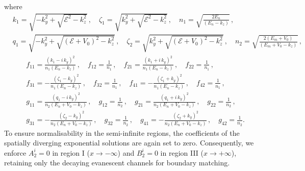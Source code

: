 \documentclass[aps,prb,onecolumn,longbibliography,nofootinbib,citeautoscript,10pt]{revtex4-2}
\def \nn{\nonumber \\}
\def\nn{\nonumber \\}
\def \nn{\nonumber \\}
\begin{document}
where 
\begin{align}
&k_1 =  \sqrt{ -k_y^2 + \sqrt{\mathcal{E}^2 - k_z^2} } \,,  \quad 
\zeta_1 =  \sqrt{ k_y^2 + \sqrt{\mathcal{E}^2 - k_z^2} } \,,  \quad 
n_1=\sqrt{\frac{2E_n} { (E_n-k_z)}} \,,  \nn  &
q_1 =  \sqrt{ -k_y^2 + \sqrt{(\mathcal{E}+V_0)^2 - k_z^2} } \,,  \quad 
\zeta_2 =  \sqrt{ k_y^2 + \sqrt{(\mathcal{E} +V_0)^2 - k_z^2} } \,,  
\quad n_2=\sqrt{\frac{2(E_m+V_0)} { (E_m+V_0-k_z)}} \,, 
\end{align}
\begin{align}
&	f_{11}= \frac{(k_1 - i\, k_y)^2} {n_1 (E_n -k_z)} \,,  \quad 	f_{12}=\frac{1} {n_1} \,,  
\quad 	f_{21}= \frac{(k_1 + i\, k_y)^2} {n_1 (E_n -k_z)} \,,  \quad 	f_{22}=\frac{1} {n_1} \,,  \nn &
f_{31}= -\frac{(\zeta_1 - k_y)^2} {n_1 (E_n -k_z)} \,,  \quad 	f_{32}=\frac{1} {n_1} \,,  
\quad 	f_{41}= -\frac{(\zeta_1 + k_y)^2} {n_1 (E_n -k_z)} \,,  \quad 	f_{42}=\frac{1} {n_1} \,,  \nn  &
g_{11}= \frac{(q_1 - i\, k_y)^2} {n_2(E_n+V_0 -k_z)} \,,  \quad 	g_{12}=\frac{1} {n_2} \,,  
\quad 	g_{21}= \frac{(q_1 + i\, k_y)^2} {n_2(E_n+V_0 -k_z)} \,,  \quad 	g_{22}=\frac{1} {n_2} \,,  \nn &
g_{31}= -\frac{(\zeta_2 - k_y)^2} {n_2(E_n+V_0 -k_z)} \,,  \quad 	
g_{32}=\frac{1} {n_2} \,,  \quad 	
g_{41}= -\frac{(\zeta_2 + k_y)^2} {n_2(E_n+V_0 -k_z)} \,,  \quad g_{42}=\frac{1} {n_2}.
\end{align}
To ensure normalisability in the semi-infinite regions, the coefficients of the spatially diverging exponential solutions are again set to zero. Consequently, we enforce $A_2^i = 0$ in region I ($x \rightarrow -\infty$) and $B_2^i = 0$ in region III ($x \rightarrow +\infty$), retaining only the decaying evanescent channels for boundary matching.
\end{document}
